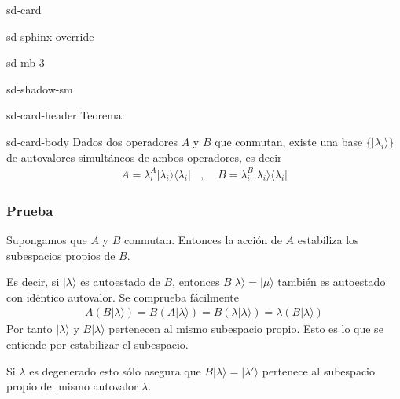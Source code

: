 \documentclass[letterpaper,10pt,english]{jupyterBook}
\newcommand{\ket}[1]{|#1\rangle}
\newcommand{\ketbra}[2]{| #1\rangle \langle #2 |}
\begin{document}
\begin{sphinxuseclass}{sd-card}
\begin{sphinxuseclass}{sd-sphinx-override}
\begin{sphinxuseclass}{sd-mb-3}
\begin{sphinxuseclass}{sd-shadow-sm}
\begin{sphinxuseclass}{sd-card-header}
\sphinxAtStartPar
Teorema:

\end{sphinxuseclass}
\begin{sphinxuseclass}{sd-card-body}
\sphinxAtStartPar
Dados dos operadores \(A\) y \(B\) que conmutan, existe una base \(\{\ket{\lambda_i}\}\) de autovalores simultáneos de ambos operadores, es decir
\begin{equation*}
\begin{split}
A = \lambda_i^A\ketbra{\lambda_i}{\lambda_i} ~~~~,~~~~~ B= \lambda_i^B\ketbra{\lambda_i}{\lambda_i} 
\end{split}
\end{equation*}
\end{sphinxuseclass}
\end{sphinxuseclass}
\end{sphinxuseclass}
\end{sphinxuseclass}
\end{sphinxuseclass}\subsubsection*{Prueba}

\sphinxAtStartPar
Supongamos que \(A\) y \(B\) conmutan. Entonces la acción de \(A\) estabiliza los subespacios propios de \(B\).

\sphinxAtStartPar
Es decir, si \(\ket{\lambda}\) es autoestado de \(B\), entonces \(B\ket{\lambda} = \ket{\mu}\) también es autoestado con idéntico autovalor. Se comprueba fácilmente
\begin{equation*}
\begin{split}
A(B\ket{\lambda} ) = B(A\ket{\lambda}) = B(\lambda\ket{\lambda}) = \lambda (B\ket{\lambda})
\end{split}
\end{equation*}
\sphinxAtStartPar
Por tanto \(\ket{\lambda}\) y \(B\ket{\lambda}\) pertenecen al mismo subespacio propio. Esto es lo que se entiende por estabilizar el subespacio.

\sphinxAtStartPar
Si \(\lambda\) es degenerado esto sólo asegura que \(B\ket{\lambda} = \ket{\lambda'}\) pertenece al subespacio propio del mismo autovalor \(\lambda\).
\end{document}
